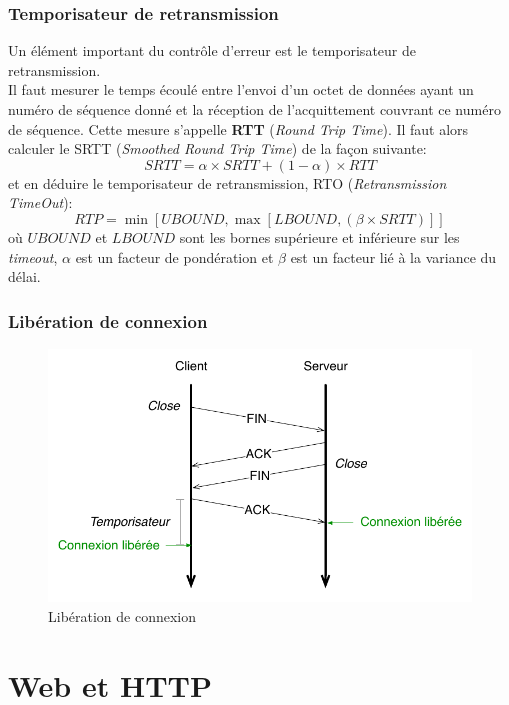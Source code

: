 \documentclass[11pt,english,french]{scrreprt}
\theoremstyle{remark}
\theoremstyle{definition}
\begin{document}
\subsection{Temporisateur de retransmission} %

Un élément important du contrôle d'erreur est le temporisateur de retransmission.\\
Il faut mesurer le temps écoulé entre l'envoi d'un octet de données ayant un numéro de séquence donné et la réception de l'acquittement couvrant ce numéro de séquence. Cette mesure s'appelle \textbf{RTT} (\emph{Round Trip Time}). Il faut alors calculer le SRTT (\emph{Smoothed Round Trip Time}) de la façon suivante:
\[
           SRTT = \alpha \times SRTT + (1 - \alpha)\times RTT
\]
et en déduire le temporisateur de retransmission, RTO (\emph{Retransmission TimeOut}):
\[
           RTP = \min\left[UBOUND, \max\left[LBOUND, (\beta \times SRTT)\right]\right]
\]
où $UBOUND$ et $LBOUND$ sont les bornes supérieure et inférieure sur les \emph{timeout}, $\alpha$ est un facteur de pondération et $\beta$ est un facteur lié à la variance du délai.

\subsection{Libération de connexion} %

\begin{figure}[h!]
	\center
	\includegraphics[scale=.75]{graphes/TCP/Liberation}
	\caption{Libération de connexion}
\end{figure}
   
\chapter{Web et HTTP} %
\label{cha:web_et_http}
\end{document}
